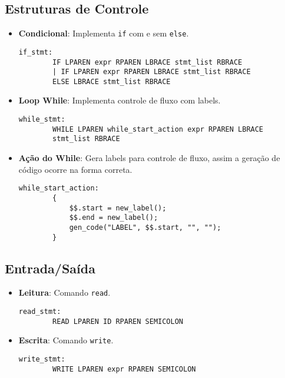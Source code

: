 \documentclass[10pt,twocolumn]{article}
\begin{document}
    \subsection{Estruturas de Controle}

        \begin{itemize}
            \item \textbf{Condicional}: Implementa \texttt{if} com e sem \texttt{else}.
            \begin{lstlisting}[caption=Estrutura condicional,captionpos=b]
    if_stmt:
        IF LPAREN expr RPAREN LBRACE stmt_list RBRACE
        | IF LPAREN expr RPAREN LBRACE stmt_list RBRACE 
        ELSE LBRACE stmt_list RBRACE
            \end{lstlisting}

            \item \textbf{Loop While}: Implementa controle de fluxo com labels.
            \begin{lstlisting}[caption=Estrutura de repetição,captionpos=b]
    while_stmt:
        WHILE LPAREN while_start_action expr RPAREN LBRACE 
        stmt_list RBRACE
            \end{lstlisting}

            \item \textbf{Ação do While}: Gera labels para controle de fluxo, assim a 
            geração de código ocorre na forma correta.
            \begin{lstlisting}[caption=Estrutura de repetição,captionpos=b]
    while_start_action:
        {
            $$.start = new_label();
            $$.end = new_label();
            gen_code("LABEL", $$.start, "", "");
        }
            \end{lstlisting}
        \end{itemize}
    
    \subsection{Entrada/Saída}

        \begin{itemize}
            \item \textbf{Leitura}: Comando \texttt{read}.
            \begin{lstlisting}[caption=Comando de leitura,captionpos=b]
    read_stmt:
        READ LPAREN ID RPAREN SEMICOLON
            \end{lstlisting}

            \item \textbf{Escrita}: Comando \texttt{write}.
            \begin{lstlisting}[caption=Comando de escrita,captionpos=b]
    write_stmt:
        WRITE LPAREN expr RPAREN SEMICOLON
            \end{lstlisting}
        \end{itemize}
    
\end{document}
